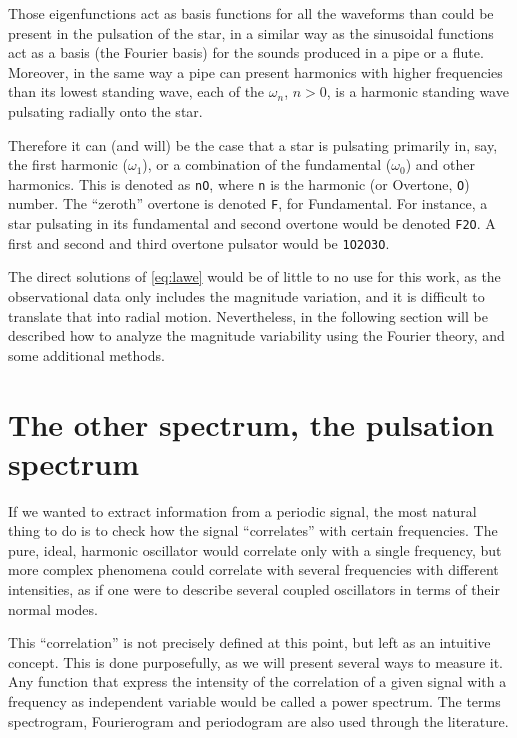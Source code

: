 	Those eigenfunctions act as basis functions for all the waveforms than could be present in the pulsation of the star,
	in a similar way as the sinusoidal functions act as a basis (the Fourier basis) for the sounds produced in a pipe or a flute.
	Moreover, in the same way a pipe can present harmonics with higher frequencies than its lowest standing wave, 
	each of the $\omega_n$, $n>0$, is a harmonic standing wave pulsating radially onto the star.
	
	Therefore it can (and will) be the case that a star is pulsating primarily in, say, the first harmonic ($\omega_1$), 
	or a combination of the fundamental ($\omega_0$) and other harmonics.
	This is denoted as \texttt{nO}, where \texttt{n} is the harmonic (or Overtone, \texttt{O}) number. The \enquote{zeroth} overtone is denoted \texttt{F}, for Fundamental.
	For instance, a star pulsating in its fundamental and second overtone would be denoted \texttt{F2O}. A first and second and third overtone pulsator would be \texttt{1O2O3O}.
	
	The direct solutions of \autoref{eq:lawe} would be of little to no use for this work, 
	as the observational data only includes the magnitude variation, 
	and it is difficult to translate that into radial motion.
	Nevertheless, in the following section will be described how to analyze the magnitude variability using the Fourier theory, and some additional methods.
	
	
\section{The other spectrum, the pulsation spectrum}

If we wanted to extract information from a periodic signal, 
the most natural thing to do is to check how the signal \enquote{correlates} with certain frequencies.
The pure, ideal, harmonic oscillator would correlate only with a single frequency,
but more complex phenomena could correlate with several frequencies with different intensities,
as if one were to describe several coupled oscillators in terms of their normal modes.

This \enquote{correlation} is not precisely defined at this point, but left as an intuitive concept.
This is done purposefully, as we will present several ways to measure it.
Any function that express the intensity of the correlation of a given signal with a frequency as independent variable
would be called a power spectrum. The terms spectrogram, Fourierogram and periodogram are also used through the literature.


